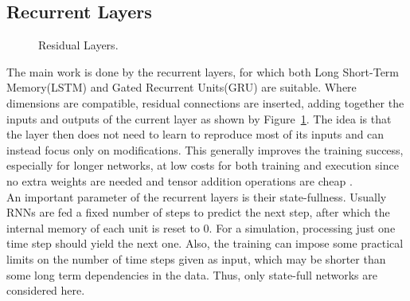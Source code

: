 \documentclass[sigconf]{acmart}
\begin{document}
\subsection{Recurrent Layers}
\begin{figure}
	\caption{Residual Layers.}
	\label{residualLayers}
\end{figure}
The main work is done by the recurrent layers, for which both Long Short-Term Memory(LSTM) and Gated Recurrent Units(GRU) are suitable. Where dimensions are compatible, residual connections are inserted, adding together the inputs and outputs of the current layer as shown by Figure~\ref{residualLayers}. The idea is that the layer then does not need to learn to reproduce most of its inputs and can instead focus only on modifications. This generally improves the training success, especially for longer networks, at low costs for both training and execution since no extra weights are needed and tensor addition operations are cheap \cite{he2016deep}. \\
An important parameter of the recurrent layers is their state-fullness. Usually RNNs are fed a fixed number of steps to predict the next step, after which the internal memory of each unit is reset to $0$. For a simulation, processing just one time step should yield the next one. Also, the training can impose some practical limits on the number of time steps given as input, which may be shorter than some long term dependencies in the data. Thus, only state-full networks are considered here.
\end{document}
